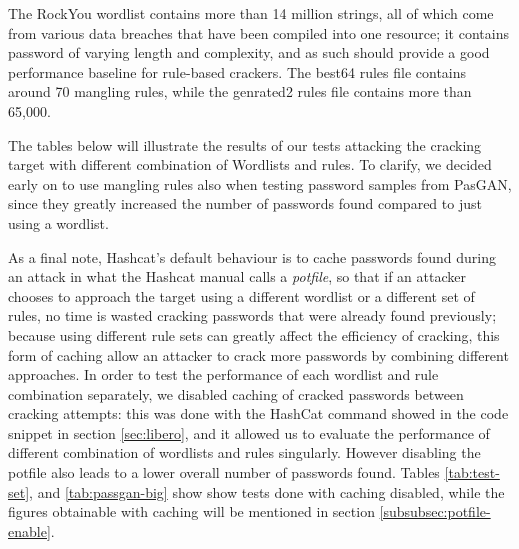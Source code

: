 The RockYou wordlist contains more than 14 million strings, all of which come from various data breaches that have been compiled into one resource; it contains password of varying length and complexity, and as such should provide a good performance baseline for rule-based crackers. The best64 rules file contains around 70 mangling rules, while the genrated2 rules file contains more than 65,000. 

The tables below will illustrate the results of our tests attacking the cracking target with different combination of Wordlists and rules. To clarify, we decided early on to use mangling rules also when testing password samples from PasGAN, since they greatly increased the number of passwords found compared to just using a wordlist. %

As a final note, Hashcat's default behaviour is to cache passwords found during an attack in what the Hashcat manual calls a \emph{potfile}, so that if an attacker chooses to approach the target using a different wordlist or a different set of rules, no time is wasted cracking passwords that were already found previously; because using different rule sets can greatly affect the efficiency of cracking, this form of caching allow an attacker to crack more passwords by combining different approaches.
In order to test the performance of each wordlist and rule combination separately, we disabled caching of cracked passwords between cracking attempts: this was done with the HashCat command showed in the code snippet in section \ref{sec:libero}, and it allowed us to evaluate the performance of different combination of wordlists and rules singularly. However disabling the potfile also leads to a lower overall number of passwords found. Tables \ref{tab:test-set}, and \ref{tab:passgan-big} show show tests done with caching disabled, while the figures obtainable with caching will be mentioned in section \ref{subsubsec:potfile-enable}. 


